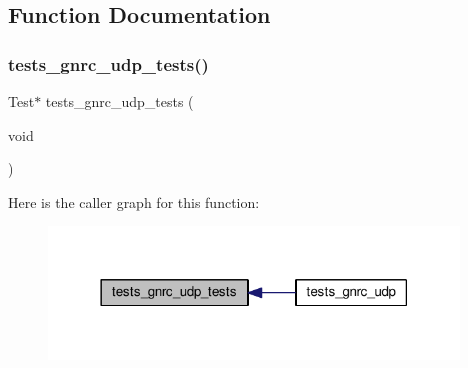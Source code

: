 \subsection{Function Documentation}
\mbox{\label{tests-gnrc__udp_8c_af3e8df2cfd9dd04deca5dff44c4a6783}} 
\subsubsection{\texorpdfstring{tests\+\_\+gnrc\+\_\+udp\+\_\+tests()}{tests\_gnrc\_udp\_tests()}}
{\footnotesize\ttfamily Test$\ast$ tests\+\_\+gnrc\+\_\+udp\+\_\+tests (\begin{DoxyParamCaption}\item[{void}]{ }\end{DoxyParamCaption})}

Here is the caller graph for this function\+:
\nopagebreak
\begin{figure}[H]
\begin{center}
\leavevmode
\includegraphics[width=309pt]{tests-gnrc__udp_8c_af3e8df2cfd9dd04deca5dff44c4a6783_icgraph}
\end{center}
\end{figure}
